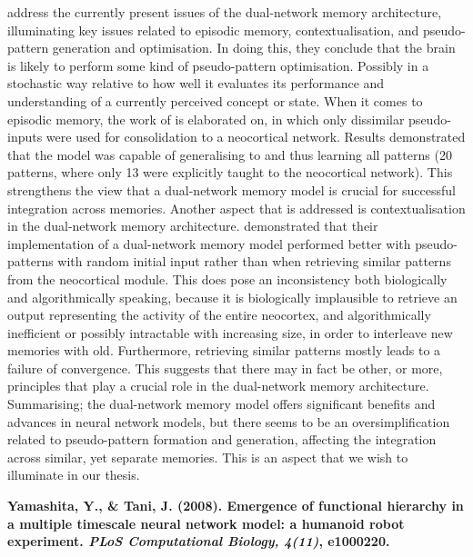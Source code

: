 \cite{French2001} address the currently present issues of the dual-network memory architecture, illuminating key issues related to episodic memory, contextualisation, and pseudo-pattern generation and optimisation. In doing this, they conclude that the brain is likely to perform some kind of pseudo-pattern optimisation. Possibly in a stochastic way relative to how well it evaluates its performance and understanding of a currently perceived concept or state. When it comes to episodic memory, the work of \cite{Ans2000} is elaborated on, in which only dissimilar pseudo-inputs were used for consolidation to a neocortical network. Results demonstrated that the model was capable of generalising to and thus learning all patterns (20 patterns, where only 13 were explicitly taught to the neocortical network). This strengthens the view that a dual-network memory model is crucial for successful integration across memories. Another aspect that is addressed is contextualisation in the dual-network memory architecture. \cite{Ans2000} demonstrated that their implementation of a dual-network memory model performed better with pseudo-patterns with random initial input rather than when retrieving similar patterns from the neocortical module. This does pose an inconsistency both biologically and algorithmically speaking, because it is biologically implausible to retrieve an output representing the activity of the entire neocortex, and algorithmically inefficient or possibly intractable with increasing size, in order to interleave new memories with old. Furthermore, retrieving similar patterns mostly leads to a failure of convergence. This suggests that there may in fact be other, or more, principles that play a crucial role in the dual-network memory architecture. Summarising; the dual-network memory model offers significant benefits and advances in neural network models, but there seems to be an oversimplification related to pseudo-pattern formation and generation, affecting the integration across similar, yet separate memories. This is an aspect that we wish to illuminate in our thesis.


\textbf{Yamashita, Y., \& Tani, J. (2008). Emergence of functional hierarchy in a multiple timescale neural network model: a humanoid robot experiment. \textit{PLoS Computational Biology, 4(11)}, e1000220.}

